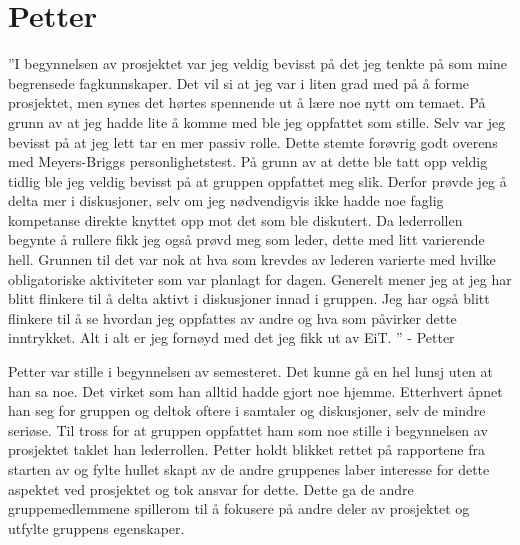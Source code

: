 \section{Petter}
''I begynnelsen av prosjektet var jeg veldig bevisst på det jeg tenkte på som mine begrensede fagkunnskaper. 
Det vil si at jeg var i liten grad med på å forme prosjektet, men synes det hørtes spennende ut å lære noe nytt om temaet. 
På grunn av at jeg hadde lite å komme med ble jeg oppfattet som stille. 
Selv var jeg bevisst på at jeg lett tar en mer passiv rolle. 
Dette stemte forøvrig godt overens med Meyers-Briggs personlighetstest. 
På grunn av at dette ble tatt opp veldig tidlig ble jeg veldig bevisst på at gruppen oppfattet meg slik. 
Derfor prøvde jeg å delta mer i diskusjoner, selv om jeg nødvendigvis ikke hadde noe faglig kompetanse direkte knyttet opp mot det som ble diskutert. 
Da lederrollen begynte å rullere fikk jeg også prøvd meg som leder, dette med litt varierende hell. 
Grunnen til det var nok at hva som krevdes av lederen varierte med hvilke obligatoriske aktiviteter som var planlagt for dagen. 
Generelt mener jeg at jeg har blitt flinkere til å delta aktivt i diskusjoner innad i gruppen. 
Jeg har også blitt flinkere til å se hvordan jeg oppfattes av andre og hva som påvirker dette inntrykket. 
Alt i alt er jeg fornøyd med det jeg fikk ut av EiT. '' \hfill - Petter
\vspace{\secspace}

Petter var stille i begynnelsen av semesteret.
Det kunne gå en hel lunsj uten at han sa noe.
Det virket som han alltid hadde gjort noe hjemme.
Etterhvert åpnet han seg for gruppen og deltok oftere i samtaler og diskusjoner, selv de mindre seriøse.
Til tross for at gruppen oppfattet ham som noe stille i begynnelsen av prosjektet taklet han lederrollen.
Petter holdt blikket rettet på rapportene fra starten av og fylte hullet skapt av de andre gruppenes laber interesse for dette aspektet ved prosjektet og tok ansvar for dette.
Dette ga de andre gruppemedlemmene spillerom til å fokusere på andre deler av prosjektet og utfylte gruppens egenskaper.
